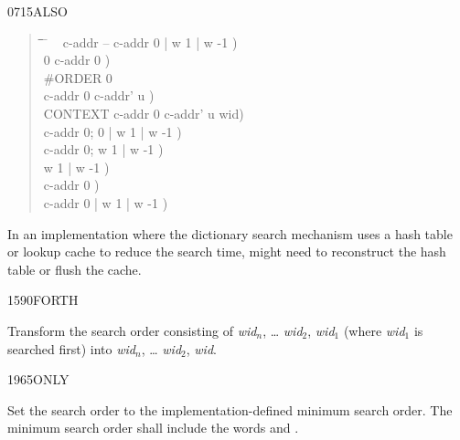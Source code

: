 \begin{newword}{0715}{ALSO}
\begin{rationale}
\begin{quote}
		\begin{tabbing}
		\tab \= \tab \= \tab \= \hspace{10em} \= \kill
		\+ \word{:} ~  c-addr -- c-addr 0 | w 1 | w -1 ) \\
				0												\>\>\>  c-addr 0 ) \\
			\+	\#ORDER  0  \\
				 						\>\>  c-addr 0 c-addr' u ) \\
				  CONTEXT \word{+} 	\>\>  c-addr 0 c-addr' u wid) \\
									\>\>  c-addr 0; 0 | w 1 | w -1 ) \\
				   c-addr 0; w 1 | w -1 ) \\
				\>   		\>	  w 1 | w -1 ) \\
			\-											\>\>  c-addr 0 ) \\
		\-												\>\>\>  c-addr 0 | w 1 | w -1 ) \\
		\word{;}
		\end{tabbing}
		\end{quote}

		In an implementation where the dictionary search mechanism
		uses a hash table or lookup cache to reduce the search time,
		 might need to reconstruct the hash table or
		flush the cache.
	\end{rationale}
\end{newword}


\begin{newword}{1590}{FORTH}
	\stack{}{}

	Transform the search order consisting of \emph{wid}$_n$, {\ldots}
	\emph{wid}$_2$, \emph{wid}$_1$ (where \emph{wid}$_1$ is searched
	first) into \emph{wid}$_n$, {\ldots} \emph{wid}$_2$,
	\emph{wid}.
\end{newword}


\begin{newword}{1965}{ONLY}
	\stack{}{}

	Set the search order to the implementation-defined minimum search
	order. The minimum search order shall include the words
	 and .
\end{newword}


